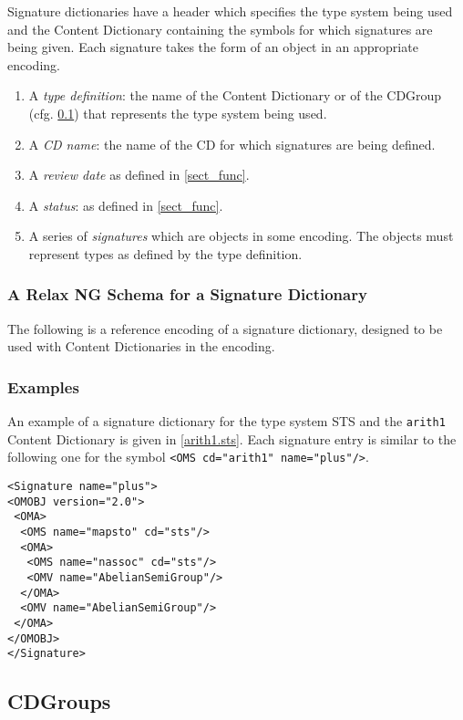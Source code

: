 Signature dictionaries have a header which specifies the type system being used and the
Content Dictionary containing the symbols for which signatures are being given. Each
signature takes the form of an \OM object in an appropriate encoding.

\begin{enumerate}
\item A \emph{type definition}: the name of the Content Dictionary or of the CDGroup
  (cfg. \ref{ssec_cdgroups}) that represents the type system being used.
\item A \emph{CD name}: the name of the CD for which signatures are being defined.
\item A \emph{review date} as defined in \ref{sect_func}.
\item A \emph{status}: as defined in \ref{sect_func}.
\item A series of \emph{signatures} which are \OM objects in some encoding.  The objects
  must represent types as defined by the type definition.
\end{enumerate}

\subsubsection{A Relax NG Schema for a Signature Dictionary}\label{sect_sigschema}

The following is a reference encoding of a signature dictionary,
designed to be used with Content Dictionaries in the \XML encoding.



\subsubsection{Examples}\label{sect_sigex}

An example of a signature dictionary for the type system STS and the \lstinline|arith1|
Content Dictionary is given in \ref{arith1.sts}. Each signature entry is similar to the
following one for the \OM symbol \lstinline|<OMS cd="arith1" name="plus"/>|.

\begin{lstlisting}
<Signature name="plus">
<OMOBJ version="2.0">
 <OMA>
  <OMS name="mapsto" cd="sts"/>
  <OMA>
   <OMS name="nassoc" cd="sts"/> 
   <OMV name="AbelianSemiGroup"/>
  </OMA>
  <OMV name="AbelianSemiGroup"/>
 </OMA>
</OMOBJ>
</Signature>
\end{lstlisting}

\subsection{CDGroups}\label{ssec_cdgroups}

